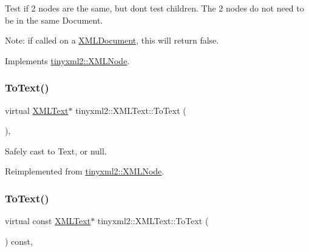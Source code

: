 Test if 2 nodes are the same, but don\textquotesingle{}t test children. The 2 nodes do not need to be in the same Document.

Note\+: if called on a \hyperlink{classtinyxml2_1_1_x_m_l_document}{X\+M\+L\+Document}, this will return false. 

Implements \hyperlink{classtinyxml2_1_1_x_m_l_node_a7ce18b751c3ea09eac292dca264f9226}{tinyxml2\+::\+X\+M\+L\+Node}.

\mbox{\label{classtinyxml2_1_1_x_m_l_text_ab1213b4ddebe9b17ec7e7040e9f1caf7}} 
\subsubsection{\texorpdfstring{To\+Text()}{ToText()}\hspace{0.1cm}{\footnotesize\ttfamily [1/2]}}
{\footnotesize\ttfamily virtual \hyperlink{classtinyxml2_1_1_x_m_l_text}{X\+M\+L\+Text}$\ast$ tinyxml2\+::\+X\+M\+L\+Text\+::\+To\+Text (\begin{DoxyParamCaption}{ }\end{DoxyParamCaption})\hspace{0.3cm}{\ttfamily [inline]}, {\ttfamily [virtual]}}



Safely cast to Text, or null. 



Reimplemented from \hyperlink{classtinyxml2_1_1_x_m_l_node_a41c55dab9162d1eb62db2008430e376b}{tinyxml2\+::\+X\+M\+L\+Node}.

\mbox{\label{classtinyxml2_1_1_x_m_l_text_a671ce22c7c5ef378f1ce31e6f827b9e2}} 
\subsubsection{\texorpdfstring{To\+Text()}{ToText()}\hspace{0.1cm}{\footnotesize\ttfamily [2/2]}}
{\footnotesize\ttfamily virtual const \hyperlink{classtinyxml2_1_1_x_m_l_text}{X\+M\+L\+Text}$\ast$ tinyxml2\+::\+X\+M\+L\+Text\+::\+To\+Text (\begin{DoxyParamCaption}{ }\end{DoxyParamCaption}) const\hspace{0.3cm}{\ttfamily [inline]}, {\ttfamily [virtual]}}



